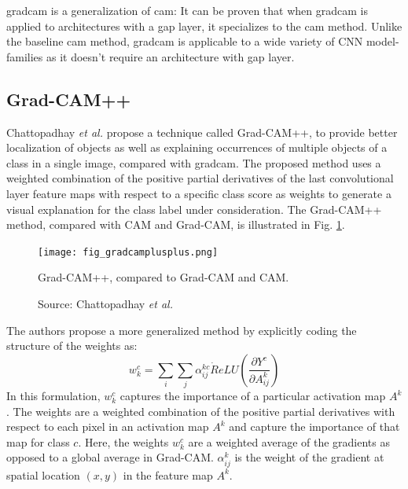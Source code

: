 \acrshort{gradcam} is a generalization of \acrshort{cam}: It can be proven that when \acrshort{gradcam} is applied to architectures with a \acrshort{gap} layer, it specializes to the \acrshort{cam} method. Unlike the baseline \acrshort{cam} method, \acrshort{gradcam} is applicable to a wide variety of CNN model-families as it doesn't require an architecture with \acrshort{gap} layer.

\subsection{Grad-CAM++}
Chattopadhay \textit{et al.} \cite{chattopadhay2018grad} propose a technique called Grad-CAM++, to provide better localization of objects
as well as explaining occurrences of multiple objects of a class in a single image, compared with \acrshort{gradcam}. The proposed method uses a weighted combination of the positive partial derivatives of the last convolutional layer feature maps with respect to a specific class score as weights to generate a visual explanation for the class label under consideration. The Grad-CAM++ method, compared with CAM and Grad-CAM, is illustrated in Fig. \ref{fig:gradcamplusplus}.

\begin{figure}[h]
    \begin{center}       
    \texttt{[image: fig\_gradcamplusplus.png]}
    \caption[Grad-CAM++]{Grad-CAM++, compared to Grad-CAM and CAM.}
    \caption*{Source: Chattopadhay \textit{et al.} \cite{chattopadhay2018grad}}
    \label{fig:gradcamplusplus}
    \end{center}
\end{figure}

The authors propose a more generalized method by explicitly coding the structure of the weights as:
\begin{equation}
    w_{k}^{c} = \sum_{i} \sum_{j} \alpha_{ij}^{kc} \dot ReLU \left( \frac{\partial{Y^c}}{\partial{A_{ij}^{k}}} \right)
\end{equation}
In this formulation, $w_{k}^{c}$ captures the importance of a particular activation map $A^k$. The weights are a weighted combination of the positive
partial derivatives with respect to each pixel in an activation map $A^k$ and capture the importance of that map for class $c$. Here, the weights $w_k^c$ are a weighted average of the gradients as opposed to a global average in Grad-CAM. $\alpha_{ij}^{k}$ is the weight of the gradient at spatial location $(x,y)$ in the feature map $A^k$. 

